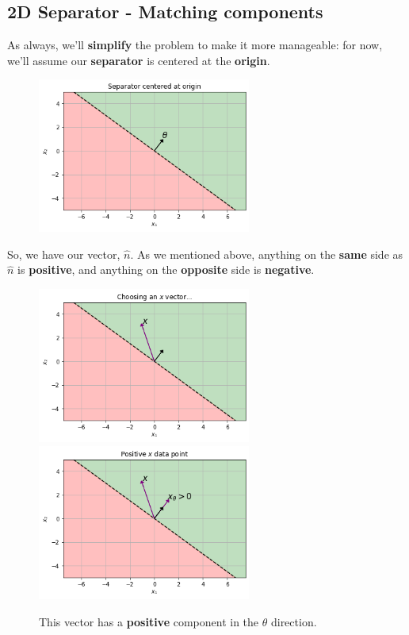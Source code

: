     \subsection*{2D Separator - Matching components}
    
        As always, we'll \textbf{simplify} the problem to make it more manageable: for now, we'll assume our \textbf{separator} is centered at the \textbf{origin}.
        
        \begin{figure}[H]
            \centering
                \includegraphics[width=70mm,scale=0.5]{images/classification_images/separator_centered_at_origin.png}
        \end{figure}
        
        So, we have our vector, $\hat{n}$. As we mentioned above, anything on the \textbf{same} side as $\hat{n}$ is \textbf{positive}, and anything on the \textbf{opposite} side is \textbf{negative}.
            \\
            
        \begin{figure}[H]
                \includegraphics[width=70mm,scale=0.5]{images/classification_images/chose_a_vector.png}
                \includegraphics[width=70mm,scale=0.5]{images/classification_images/positive_v_vector.png}
                
                \caption*{This vector has a \textbf{positive} component in the $\theta$ direction.}
        \end{figure}
        
